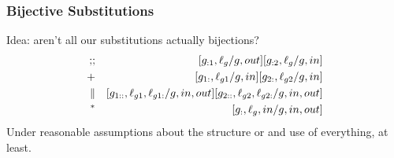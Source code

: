 \subsubsection{Bijective Substitutions}

Idea: aren't all our substitutions actually bijections?
\begin{eqnarray*}
   \mathbin{;\!;}
   &&
   [g_{:1},\ell_g/g,out]
   [g_{:2},\ell_g/g,in]
\\ +
   &&
   [g_{1:},\ell_{g1}/g,in]
   [g_{2:},\ell_{g2}/g,in]
\\ \parallel
   &&
   [g_{1::},\ell_{g1},\ell_{g1:}/g,in,out]
   [g_{2::},\ell_{g2},\ell_{g2:}/g,in,out]
\\ {}^*
   &&
   [g_{:},\ell_g,in/g,in,out]
\end{eqnarray*}
Under reasonable assumptions about the structure or and use of everything,
at least.
